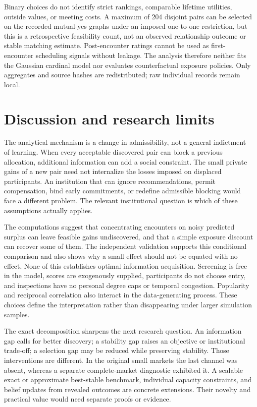 \documentclass[11pt,a4paper]{article}
\begin{document}
Binary choices do not identify strict rankings, comparable lifetime utilities, outside values, or meeting costs. A maximum of 204 disjoint pairs can be selected on the recorded mutual-yes graphs under an imposed one-to-one restriction, but this is a retrospective feasibility count, not an observed relationship outcome or stable matching estimate. Post-encounter ratings cannot be used as first-encounter scheduling signals without leakage. The analysis therefore neither fits the Gaussian cardinal model nor evaluates counterfactual exposure policies. Only aggregates and source hashes are redistributed; raw individual records remain local.

\section{Discussion and research limits}
The analytical mechanism is a change in admissibility, not a general indictment of learning. When every acceptable discovered pair can block a previous allocation, additional information can add a social constraint. The small private gains of a new pair need not internalize the losses imposed on displaced participants. An institution that can ignore recommendations, permit compensation, bind early commitments, or redefine admissible blocking would face a different problem. The relevant institutional question is which of these assumptions actually applies.

The computations suggest that concentrating encounters on noisy predicted surplus can leave feasible gains undiscovered, and that a simple exposure discount can recover some of them. The independent validation supports this conditional comparison and also shows why a small effect should not be equated with no effect. None of this establishes optimal information acquisition. Screening is free in the model, scores are exogenously supplied, participants do not choose entry, and inspections have no personal degree caps or temporal congestion. Popularity and reciprocal correlation also interact in the data-generating process. These choices define the interpretation rather than disappearing under larger simulation samples.

The exact decomposition sharpens the next research question. An information gap calls for better discovery; a stability gap raises an objective or institutional trade-off; a selection gap may be reduced while preserving stability. Those interventions are different. In the original small markets the last channel was absent, whereas a separate complete-market diagnostic exhibited it. A scalable exact or approximate best-stable benchmark, individual capacity constraints, and belief updates from revealed outcomes are concrete extensions. Their novelty and practical value would need separate proofs or evidence.
\end{document}
